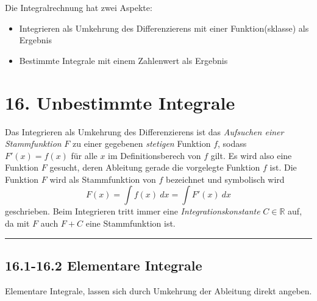 \documentclass[a4paper,landscape,8pt]{extarticle}
\newcommand{\R}{\mathbb{R}}
\newcommand{\sep}{\vspace{5pt}\noindent\hrule\vspace{5pt}}
\begin{document}
\begin{multicols*}{4}
Die Integralrechnung hat zwei Aspekte:
\begin{itemize}
  \item Integrieren als Umkehrung des Differenzierens mit einer
  Funktion(sklasse) als Ergebnis
  \item Bestimmte Integrale mit einem Zahlenwert als Ergebnis
\end{itemize}

\section{16. Unbestimmte Integrale}

\Def Das Integrieren als Umkehrung des Differenzierens ist das \emph{Aufsuchen
einer Stammfunktion} $F$ zu einer gegebenen \emph{stetigen} Funktion $f$,
sodass $F'(x)=f(x)$ für alle $x$ im Definitionsberech von $f$ gilt. Es wird also eine
Funktion $F$ gesucht, deren Ableitung gerade die vorgelegte Funktion $f$ ist.
Die Funktion $F$ wird als Stammfunktion von $f$ bezeichnet und symbolisch wird
\[
F(x) = \int f(x) \ dx = \int F'(x) \ dx
\]
geschrieben. Beim Integrieren tritt immer eine \emph{Integrationskonstante}
$C\in\R$ auf, da mit $F$ auch $F+C$ eine Stammfunktion ist.

\sep

\subsection{16.1-16.2 Elementare Integrale}

Elementare Integrale, lassen sich durch Umkehrung der Ableitung
direkt angeben.


\end{multicols*}
\end{document}
